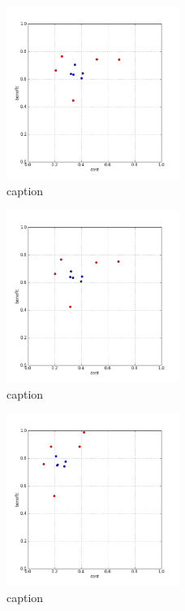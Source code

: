 %
\begin{figure}[!ht]
	\centering
	\includegraphics[width=0.5\textwidth]{img/p1figs/computeFrameStateLauge_simpleCompare_smooth0_tol0.png}
	\caption{caption}
\end{figure}
%
\begin{figure}[!ht]
	\centering
	\includegraphics[width=0.5\textwidth]{img/p1figs/computeFrameStateLauge_simpleCompare_smooth12_tol0.png}
	\caption{caption}
\end{figure}
%
\begin{figure}[!ht]
	\centering
	\includegraphics[width=0.5\textwidth]{img/p1figs/computeFrameStateMagnitudeOnly_sectionCompareBetter_smooth0_tol12.png}
	\caption{caption}
\end{figure}
